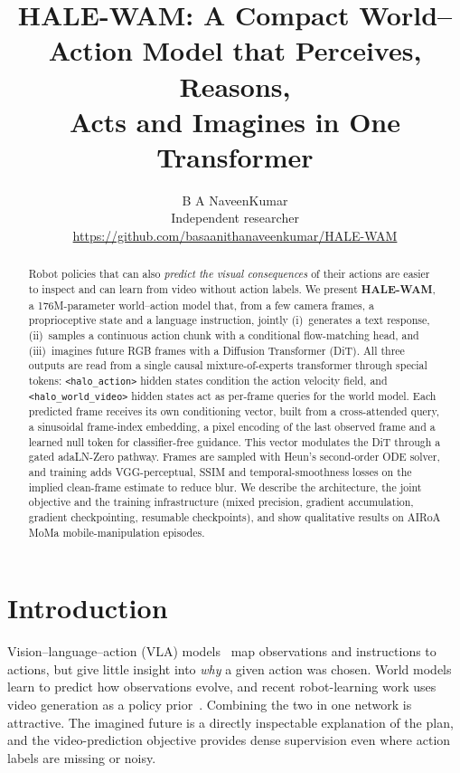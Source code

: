 \documentclass[11pt]{article}
\title{\textbf{HALE-WAM: A Compact World--Action Model that Perceives, Reasons,\\Acts and Imagines in One Transformer}}
\author{B A NaveenKumar\\
\small Independent researcher\\
\small \url{https://github.com/basaanithanaveenkumar/HALE-WAM}}
\date{}
\newcommand{\tok}[1]{\texttt{<#1>}}
\begin{document}
\maketitle

\begin{abstract}
Robot policies that can also \emph{predict the visual consequences} of their actions are
easier to inspect and can learn from video without action labels. We present
\textbf{HALE-WAM}, a 176M-parameter world--action model that, from a few camera frames, a
proprioceptive state and a language instruction, jointly (i)~generates a text response,
(ii)~samples a continuous action chunk with a conditional flow-matching head, and
(iii)~imagines future RGB frames with a Diffusion Transformer (DiT). All three outputs are
read from a single causal mixture-of-experts transformer through special tokens:
\tok{halo\_action} hidden states condition the action velocity field, and
\tok{halo\_world\_video} hidden states act as per-frame queries for the world model. Each
predicted frame receives its own conditioning vector, built from a cross-attended query, a
sinusoidal frame-index embedding, a pixel encoding of the last observed frame and a learned
null token for classifier-free guidance. This vector modulates the DiT through a gated
adaLN-Zero pathway. Frames are sampled with Heun's second-order ODE solver, and training
adds VGG-perceptual, SSIM and temporal-smoothness losses on the implied clean-frame
estimate to reduce blur. We describe the architecture, the joint objective and the
training infrastructure (mixed precision, gradient accumulation, gradient checkpointing,
resumable checkpoints), and show qualitative results on AIRoA MoMa mobile-manipulation
episodes.
\end{abstract}

\section{Introduction}

Vision--language--action (VLA) models~\cite{brohan2023rt2,kim2024openvla,black2024pi0} map
observations and instructions to actions, but give little insight into \emph{why} a given
action was chosen. World models~\cite{ha2018worldmodels,hafner2023dreamerv3} learn to predict
how observations evolve, and recent robot-learning work uses video generation as a policy
prior~\cite{du2023unipi,wu2023gr1}. Combining the two in one network is attractive. The
imagined future is a directly inspectable explanation of the plan, and the video-prediction
objective provides dense supervision even where action labels are missing or noisy.
\end{document}
